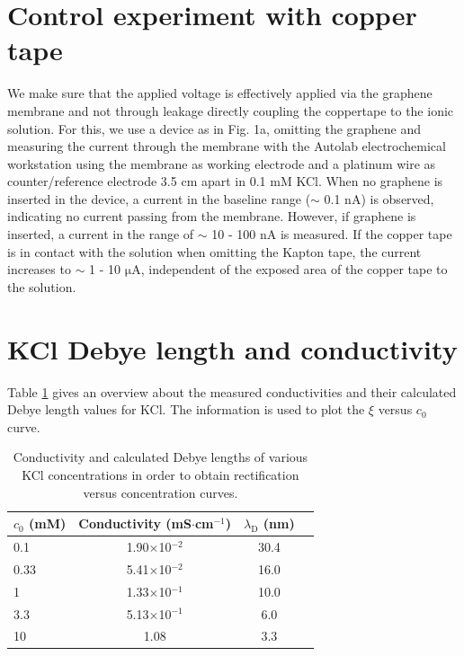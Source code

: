 \documentclass[manuscript=suppinfo,email=true, hyperref=true, keywords=false]{achemso}
\newcommand{\Fig}{Fig.}
\begin{document}
\section{Control experiment with copper tape}
\label{sec:copper}
We make sure that the applied voltage is effectively applied via the
graphene membrane and not through leakage directly coupling the
coppertape to the ionic solution. For this, we use a device as in \Fig
1a, omitting the graphene and measuring the current through the
membrane with the Autolab electrochemical workstation using the
membrane as working electrode and a platinum wire as counter/reference
electrode 3.5 cm apart in 0.1 mM KCl. When no graphene is inserted in
the device, a current in the baseline range ($\sim$ 0.1 nA) is
observed, indicating no current passing from the membrane. However, if
graphene is inserted, a current in the range of $\sim$ 10 - 100 nA is
measured. If the copper tape is in contact with the solution when
omitting the Kapton tape, the current increases to $\sim$ 1 - 10
$\mathrm{\mu}$A, independent of the exposed area of the copper tape to
the solution.

\section{KCl Debye length and conductivity}
\label{sec:debye}
Table \ref{tab:debye} gives an overview about the measured
conductivities and their calculated Debye length values for KCl. The
information is used to plot the $\xi$ versus $c_{0}$ curve.

\begin{table}[htbp]
  \centering
  \begin{tabular}{lccc}
    \hline
    $c_{0}$ (mM) & Conductivity (mS$\cdot$cm$^{-1}$) & $\lambda_{\mathrm{D}}$ (nm)\\
    \hline
    0.1&        1.90$\times$10$^{-2}$ &        30.4\\
    0.33&       5.41$\times$10$^{-2}$ & 16.0\\
    1   &1.33$\times$10$^{-1}$ & 10.0\\
    3.3&     5.13$\times$10$^{-1}$ &  6.0\\
    10&      1.08    &3.3\\
    \hline
  \end{tabular}
  \caption{Conductivity and calculated Debye lengths of various KCl
    concentrations in order to obtain rectification versus
    concentration curves. }
  \label{tab:debye}
\end{table}
\end{document}
